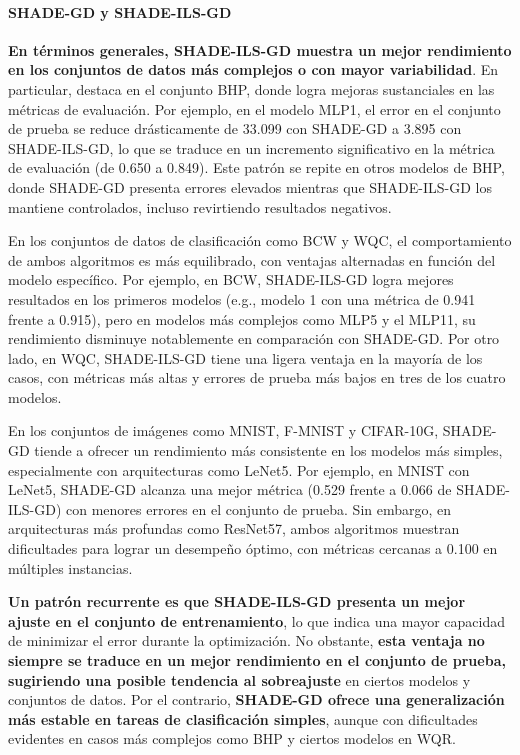\vspace{0.4cm}
\paragraph{SHADE-GD y SHADE-ILS-GD\\} 

\mbox{}
\vspace{0.1cm}

\textbf{En términos generales, SHADE-ILS-GD muestra un mejor rendimiento en los conjuntos de datos más complejos o con mayor variabilidad}. En particular, destaca en el conjunto BHP, donde logra mejoras sustanciales en las métricas de evaluación. Por ejemplo, en el modelo MLP1, el error en el conjunto de prueba se reduce drásticamente de 33.099 con SHADE-GD a 3.895 con SHADE-ILS-GD, lo que se traduce en un incremento significativo en la métrica de evaluación (de 0.650 a 0.849). Este patrón se repite en otros modelos de BHP, donde SHADE-GD presenta errores elevados mientras que SHADE-ILS-GD los mantiene controlados, incluso revirtiendo resultados negativos.

En los conjuntos de datos de clasificación como BCW y WQC, el comportamiento de ambos algoritmos es más equilibrado, con ventajas alternadas en función del modelo específico. Por ejemplo, en BCW, SHADE-ILS-GD logra mejores resultados en los primeros modelos (e.g., modelo 1 con una métrica de 0.941 frente a 0.915), pero en modelos más complejos como MLP5 y el MLP11, su rendimiento disminuye notablemente en comparación con SHADE-GD. Por otro lado, en WQC, SHADE-ILS-GD tiene una ligera ventaja en la mayoría de los casos, con métricas más altas y errores de prueba más bajos en tres de los cuatro modelos.

En los conjuntos de imágenes como MNIST, F-MNIST y CIFAR-10G, SHADE-GD tiende a ofrecer un rendimiento más consistente en los modelos más simples, especialmente con arquitecturas como LeNet5. Por ejemplo, en MNIST con LeNet5, SHADE-GD alcanza una mejor métrica (0.529 frente a 0.066 de SHADE-ILS-GD) con menores errores en el conjunto de prueba. Sin embargo, en arquitecturas más profundas como ResNet57, ambos algoritmos muestran dificultades para lograr un desempeño óptimo, con métricas cercanas a 0.100 en múltiples instancias.

\textbf{Un patrón recurrente es que SHADE-ILS-GD presenta un mejor ajuste en el conjunto de entrenamiento}, lo que indica una mayor capacidad de minimizar el error durante la optimización. No obstante, \textbf{esta ventaja no siempre se traduce en un mejor rendimiento en el conjunto de prueba, sugiriendo una posible tendencia al sobreajuste} en ciertos modelos y conjuntos de datos. Por el contrario, \textbf{SHADE-GD ofrece una generalización más estable en tareas de clasificación simples}, aunque con dificultades evidentes en casos más complejos como BHP y ciertos modelos en WQR.

